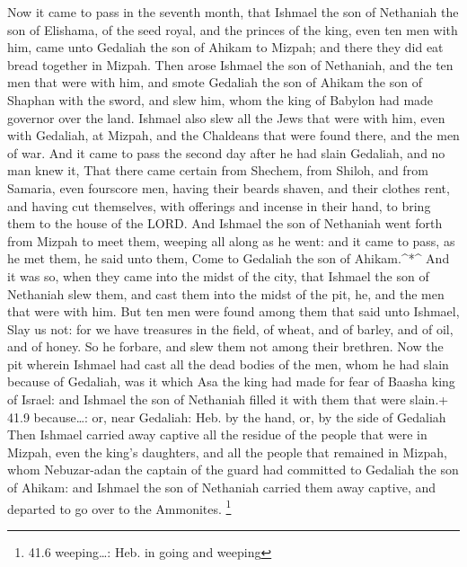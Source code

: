  Now it came to pass in the seventh month, that Ishmael the
son of Nethaniah the son of Elishama, of the seed royal, and the princes
of the king, even ten men with him, came unto Gedaliah the son of Ahikam
to Mizpah; and there they did eat bread together in Mizpah. 
Then arose Ishmael the son of Nethaniah, and the ten men that were with
him, and smote Gedaliah the son of Ahikam the son of Shaphan with the
sword, and slew him, whom the king of Babylon had made governor over the
land.  Ishmael also slew all the Jews that were with him,
even with Gedaliah, at Mizpah, and the Chaldeans that were found there,
and the men of war.  And it came to pass the second day
after he had slain Gedaliah, and no man knew it,  That there
came certain from Shechem, from Shiloh, and from Samaria, even fourscore
men, having their beards shaven, and their clothes rent, and having cut
themselves, with offerings and incense in their hand, to bring them to
the house of the LORD.  And Ishmael the son of Nethaniah
went forth from Mizpah to meet them, weeping all along as he went: and
it came to pass, as he met them, he said unto them, Come to Gedaliah the
son of Ahikam.\^{}*\^{}  And it was so, when they came into
the midst of the city, that Ishmael the son of Nethaniah slew them, and
cast them into the midst of the pit, he, and the men that were with him.
 But ten men were found among them that said unto Ishmael,
Slay us not: for we have treasures in the field, of wheat, and of
barley, and of oil, and of honey. So he forbare, and slew them not among
their brethren.  Now the pit wherein Ishmael had cast all
the dead bodies of the men, whom he had slain because of Gedaliah, was
it which Asa the king had made for fear of Baasha king of Israel: and
Ishmael the son of Nethaniah filled it with them that were slain.+ 41.9
because\ldots: or, near Gedaliah: Heb. by the hand, or, by the side of
Gedaliah  Then Ishmael carried away captive all the residue
of the people that were in Mizpah, even the king's daughters, and all
the people that remained in Mizpah, whom Nebuzar-adan the captain of the
guard had committed to Gedaliah the son of Ahikam: and Ishmael the son
of Nethaniah carried them away captive, and departed to go over to the
Ammonites. \footnote{41.6 weeping\ldots: Heb. in going and weeping}


